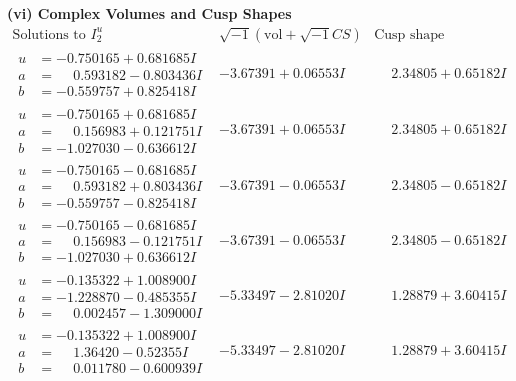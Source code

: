 \documentclass[1p]{elsarticle_modified}
\theoremstyle{definition}
\newcommand{\I}{\sqrt{-1}}
\begin{document}
\newpage\flushleft \textbf{(vi) Complex Volumes and Cusp Shapes}
$$\begin{array}{c|c|c}  
\text{Solutions to }I^u_{2}& \I (\text{vol} + \sqrt{-1}CS) & \text{Cusp shape}\\
 \hline 
\begin{aligned}
u &= -0.750165 + 0.681685 I \\
a &= \phantom{-}0.593182 - 0.803436 I \\
b &= -0.559757 + 0.825418 I\end{aligned}
 & -3.67391 + 0.06553 I & \phantom{-}2.34805 + 0.65182 I \\ \hline\begin{aligned}
u &= -0.750165 + 0.681685 I \\
a &= \phantom{-}0.156983 + 0.121751 I \\
b &= -1.027030 - 0.636612 I\end{aligned}
 & -3.67391 + 0.06553 I & \phantom{-}2.34805 + 0.65182 I \\ \hline\begin{aligned}
u &= -0.750165 - 0.681685 I \\
a &= \phantom{-}0.593182 + 0.803436 I \\
b &= -0.559757 - 0.825418 I\end{aligned}
 & -3.67391 - 0.06553 I & \phantom{-}2.34805 - 0.65182 I \\ \hline\begin{aligned}
u &= -0.750165 - 0.681685 I \\
a &= \phantom{-}0.156983 - 0.121751 I \\
b &= -1.027030 + 0.636612 I\end{aligned}
 & -3.67391 - 0.06553 I & \phantom{-}2.34805 - 0.65182 I \\ \hline\begin{aligned}
u &= -0.135322 + 1.008900 I \\
a &= -1.228870 - 0.485355 I \\
b &= \phantom{-}0.002457 - 1.309000 I\end{aligned}
 & -5.33497 - 2.81020 I & \phantom{-}1.28879 + 3.60415 I \\ \hline\begin{aligned}
u &= -0.135322 + 1.008900 I \\
a &= \phantom{-}1.36420 - 0.52355 I \\
b &= \phantom{-}0.011780 - 0.600939 I\end{aligned}
 & -5.33497 - 2.81020 I & \phantom{-}1.28879 + 3.60415 I \\ \hline\begin{aligned}

\end{aligned}
\end{array}$$
\end{document}
